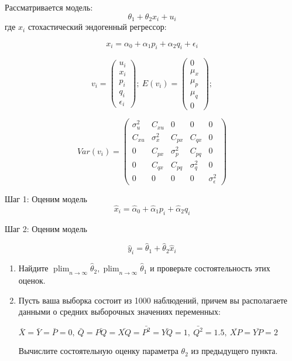 \documentclass[10pt, a4paper]{extarticle}
\DeclareMathOperator{\plim}{plim}
\begin{document}
Рассматривается модель: 
\[
\theta_1 + \theta_2 x_i + u_i
\]
где $x_i$ стохастический эндогенный
регрессор:

\[
x_i = \alpha_0 + \alpha_1 p_i + \alpha_2 q_i + \epsilon_i
\]


\[
v_{i} = \begin{pmatrix}  u_{i} \\ x_{i} \\  p_{i} \\ q_{i}  \\ \epsilon_{i} \end{pmatrix}; \ E(v_{i}) = \begin{pmatrix}  0 \\ \mu_{x} \\ \mu_{p} \\ \mu_{q} \\ 0\end{pmatrix};
\]

\[
Var(v_{i}) = \begin{pmatrix}  \sigma_{u}^2 & C_{xu} & 0 & 0 & 0\\
C_{xu} & \sigma_{x}^2  & C_{px} & C_{qx} & 0\\
0 & C_{px} & \sigma_p^2 & C_{pq}  & 0\\
0 & C_{qx} & C_{pq} & \sigma_q^2 & 0 \\
0 & 0 & 0 & 0 & \sigma_\epsilon^2\end{pmatrix}
\]

Шаг 1: Оценим модель
\[
\hat{x}_i = \hat{\alpha}_0 + \hat{\alpha}_1 p_i + \hat{\alpha}_2 q_i
\]

Шаг 2: Оценим модель

\[
\hat{y}_i = \hat{\theta}_1 + \hat{\theta}_2 \hat{x}_i
\]

\begin{enumerate}
	\item  Найдите $\plim_{n \to \infty} \hat \theta_{2}, \plim_{n \to \infty} \hat \theta_{1}$  и проверьте состоятельность этих оценок.
	
	\item Пусть ваша выборка состоит из 1000 наблюдений, причем вы располагаете данными о средних выборочных значениях переменных:
	
	$\bar{X} = \bar{Y} = \bar{P} = 0, \ \bar{Q} = \bar{PQ} = \bar{XQ} = \bar{P^2} = \bar{YQ} = 1, \ \bar{Q^2} = 1.5, \ \bar{XP} = \bar{YP} = 2$
	
	Вычислите состоятельную оценку параметра $\theta_2$ из предыдущего пункта.
\end{enumerate}
\end{document}
